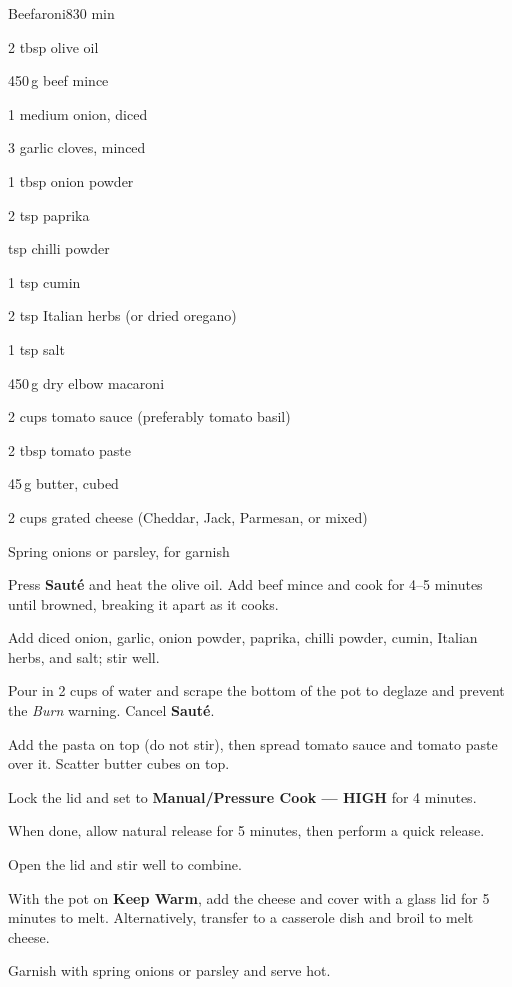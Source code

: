\begin{recipebox}{Beefaroni}{8}{30 min}
  \begin{ingredients}
    \item 2 tbsp olive oil
    \item 450\,g beef mince
    \item 1 medium onion, diced
    \item 3 garlic cloves, minced
    \item 1 tbsp onion powder
    \item 2 tsp paprika
    \item {} tsp chilli powder
    \item 1 tsp cumin
    \item 2 tsp Italian herbs (or dried oregano)
    \item 1 tsp salt
    \item 450\,g dry elbow macaroni
    \item 2 cups tomato sauce (preferably tomato basil)
    \item 2 tbsp tomato paste
    \item 45\,g butter, cubed
    \item 2 cups grated cheese (Cheddar, Jack, Parmesan, or mixed)
    \item Spring onions or parsley, for garnish
  \end{ingredients}

  \begin{method}
    \item Press \textbf{Sauté} and heat the olive oil. Add beef mince and cook for 4–5 minutes until browned, breaking it apart as it cooks.
    \item Add diced onion, garlic, onion powder, paprika, chilli powder, cumin, Italian herbs, and salt; stir well.
    \item Pour in 2 cups of water and scrape the bottom of the pot to deglaze and prevent the \emph{Burn} warning. Cancel \textbf{Sauté}.
    \item Add the pasta on top (do not stir), then spread tomato sauce and tomato paste over it. Scatter butter cubes on top.
    \item Lock the lid and set to \textbf{Manual/Pressure Cook — HIGH} for 4 minutes.
    \item When done, allow natural release for 5 minutes, then perform a quick release.
    \item Open the lid and stir well to combine.
    \item With the pot on \textbf{Keep Warm}, add the cheese and cover with a glass lid for 5 minutes to melt. Alternatively, transfer to a casserole dish and broil to melt cheese.
    \item Garnish with spring onions or parsley and serve hot.
  \end{method}


\end{recipebox}
